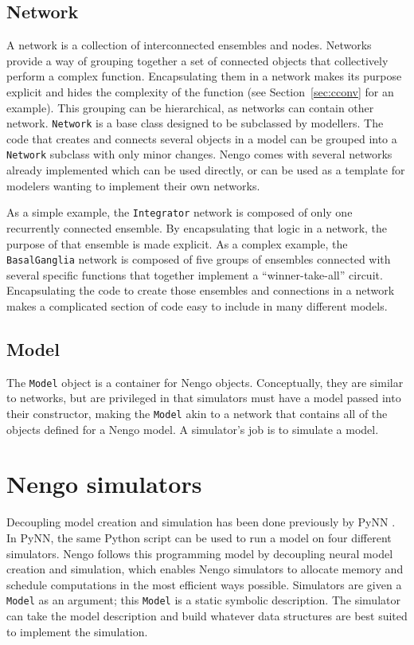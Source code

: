 \documentclass{frontiersSCNS}
\begin{document}
\subsection{Network}

A network is a collection of interconnected ensembles and nodes.
Networks provide a way of grouping together
a set of connected objects
that collectively perform a complex function.
Encapsulating them in a network
makes its purpose explicit
and hides the complexity of the function
(see Section~\ref{sec:cconv} for an example).
This grouping can be hierarchical,
as networks can contain other network.
\texttt{Network} is a base class designed to be
subclassed by modellers.
The code that creates and connects
several objects in a model can be
grouped into a \texttt{Network} subclass
with only minor changes.
Nengo comes with several networks already implemented
which can be used directly,
or can be used as a template
for modelers wanting to implement their own networks.

As a simple example, the \texttt{Integrator} network
is composed of only one recurrently connected ensemble.
By encapsulating that logic in a network,
the purpose of that ensemble is made explicit.
As a complex example,
the \texttt{BasalGanglia} network
is composed of five groups of ensembles
connected with several specific functions
that together implement a ``winner-take-all'' circuit.
Encapsulating the code to create those ensembles
and connections in a network
makes a complicated section of code
easy to include in many different models.

\subsection{Model}

The \texttt{Model} object is a container
for Nengo objects.
Conceptually, they are similar to networks,
but are privileged in that
simulators must have a model
passed into their constructor,
making the \texttt{Model} akin
to a network that contains
all of the objects defined for a Nengo model.
A simulator's job is to simulate a model.

\section{Nengo simulators} \label{sec:simulators}

Decoupling model creation and simulation
has been done previously
by PyNN \citep{davison2009}.
In PyNN, the same Python script
can be used to run a model
on four different simulators.
Nengo follows this programming model by
decoupling neural model creation and simulation,
which enables Nengo simulators
to allocate memory and schedule computations
in the most efficient ways possible.
Simulators are given a \texttt{Model}
as an argument;
this \texttt{Model} is a static symbolic description.
The simulator can take the model description
and build whatever data structures
are best suited to implement the simulation.
\end{document}

